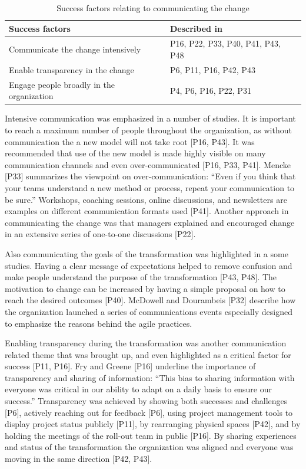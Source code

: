 \begin{table}[h]
    \centering
    \begin{tabular}{ >{\raggedright\arraybackslash}p{}
                     >{\raggedright\arraybackslash}p{} }
        \toprule
        Success factors  &  Described in \\
        \midrule
        Communicate the change intensively  &
                P16, P22, P33, P40, P41, P43, P48  \\
        Enable transparency in the change  &
                P6, P11, P16, P42, P43  \\
        Engage people broadly in the organization  &
                P4, P6, P16, P22, P31 \\
        \bottomrule
    \end{tabular}
    \caption{Success factors relating to communicating the change}
    \label{table:success_communication}
\end{table}


Intensive communication was emphasized in a number of studies. It is important
to reach a maximum number of people throughout the organization, as without
communication the a new model will not take root [P16, P43].
It was recommended that use of the new model is made highly visible on many
communication channels and even over-communicated [P16, P33, P41]. Mencke [P33]
summarizes the viewpoint on over-communication: ``Even if you think that your
teams understand a new method or process, repeat your communication to be
sure.'' Workshops, coaching sessions, online discussions, and newsletters are
examples on different communication formats used [P41]. Another approach in
communicating the change was that managers explained and encouraged change in an
extensive series of one-to-one discussions [P22].

Also communicating the goals of the transformation was highlighted in a some
studies.
Having a clear message of expectations helped to remove confusion and make
people understand the purpose of the transformation [P43, P48]. The motivation
to change can be increased by having a simple proposal on how to reach the
desired outcomes [P40].
McDowell and Dourambeis [P32] describe how the organization launched a series of
communications events especially designed to emphasize the reasons behind the
agile practices.

Enabling transparency during the transformation was another communication
related theme that was brought up, and even highlighted as a critical factor for
success [P11, P16]. Fry and Greene [P16] underline the importance of
transparency and sharing of information: ``This bias to sharing information with
everyone was critical in our ability to adapt on a daily basis to ensure our
success.'' Transparency was achieved by showing both successes and challenges
[P6], actively reaching out for feedback [P6], using project management tools to
display project status publicly [P11], by rearranging physical spaces [P42], and
by holding the meetings of the roll-out team in public [P16].
By sharing experiences and status of the transformation the organization was
aligned and everyone was moving in the same direction [P42, P43].

